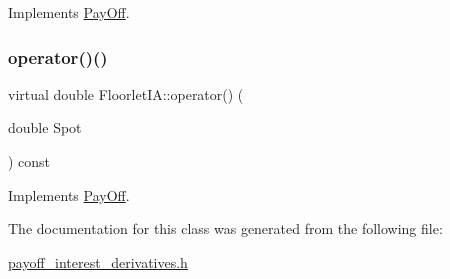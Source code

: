 Implements \hyperlink{classPayOff_ad8194d5b82247ae89c25c515f0ba806a}{Pay\+Off}.

\hypertarget{classFloorletIA_aab8c119bc89c1a1000b5185384cf56bc}{}\label{classFloorletIA_aab8c119bc89c1a1000b5185384cf56bc} 
\subsubsection{\texorpdfstring{operator()()}{operator()()}}
{\footnotesize\ttfamily virtual double Floorlet\+I\+A\+::operator() (\begin{DoxyParamCaption}\item[{double}]{Spot }\end{DoxyParamCaption}) const\hspace{0.3cm}{\ttfamily [virtual]}}



Implements \hyperlink{classPayOff_a5ae17d82c233ef5568c8fb0539703000}{Pay\+Off}.



The documentation for this class was generated from the following file\+:\begin{DoxyCompactItemize}
\item 
\hyperlink{payoff__interest__derivatives_8h}{payoff\+\_\+interest\+\_\+derivatives.\+h}\end{DoxyCompactItemize}
